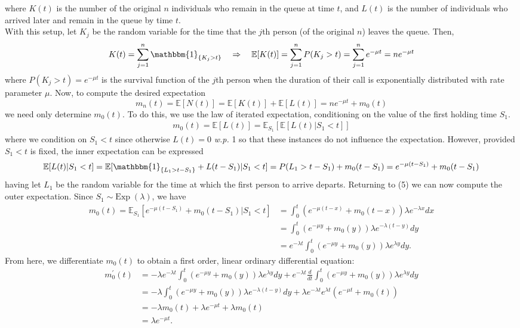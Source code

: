 \documentclass[11pt, letterpaper]{article}
\newcommand{\mbb}[1]{\mathbb{#1}}
\begin{document}
    where $K(t)$ is the number of the original $n$ individuals who remain in the queue at time $t$, and $L(t)$ is the number of individuals
    who arrived later and remain in the queue by time $t$.\\[10pt]
    With this setup, let $K_j$ be the random variable for the time that the $j$th person (of the original $n$) leaves the queue. Then,
    \[K(t)=\sum_{j=1}^n\mathbbm{1}_{\{K_j>t\}}\quad\Rightarrow\quad\mbb{E}[K(t)]=\sum_{j=1}^nP(K_j>t)=\sum_{j=1}^ne^{-\mu t}=ne^{-\mu t}\]
    where $P(K_j>t)=e^{-\mu t}$ is the survival function of the $j$th person when the duration of their call is exponentially distributed with rate parameter $\mu$. Now, to compute the desired expectation
    \[m_n(t)=\mbb{E}[N(t)]=\mbb{E}[K(t)]+\mbb{E}[L(t)]=ne^{-\mu t}+m_0(t)\]
    we need only determine $m_0(t)$. To do this, we use the law of iterated expectation, conditioning on the value of the first holding time $S_1$.
    \begin{align*}
        m_0(t)=\mbb{E}[L(t)]=\mbb{E}_{S_1}[\mbb{E}[L(t)|S_1<t]]\tag{5}
    \end{align*}
    where we condition on $S_1<t$ since otherwise $L(t)=0$ {\it w.p.} 1 so that these instances do not influence the expectation. However, provided $S_1<t$ is fixed, the inner expectation can be expressed
    \[\mbb{E}[L(t)|S_1<t]=\mbb{E}[\mathbbm{1}_{\{L_1>t-S_1\}}+L(t-S_1)|S_1<t]=P(L_1>t-S_1)+m_0(t-S_1)=e^{-\mu(t-S_1)}+m_0(t-S_1)\]
    having let $L_1$ be the random variable for the time at which the first person to arrive departs. Returning to (5) we can now compute the outer expectation. Since $S_1\sim\text{Exp}\;(\lambda)$, we have
    \begin{align*}
        m_0(t)=\mbb{E}_{S_1}[e^{-\mu(t-S_1)}+m_0(t-S_1)|S_1<t]&=\int_{0}^t\left(e^{-\mu(t-x)}+m_0(t-x)\right)\lambda e^{-\lambda x}dx\\
        &=\int_0^t\left(e^{-\mu y}+m_0(y)\right)\lambda e^{-\lambda(t-y)}dy\tag{substituting $y=t-x$}\\
        &=e^{-\lambda t}\int_0^t\left(e^{-\mu y}+m_0(y)\right)\lambda e^{\lambda y}dy.
    \end{align*}
    From here, we differentiate $m_0(t)$ to obtain a first order, linear ordinary differential equation:
    \begin{align*}
        m_0^\prime(t)&=-\lambda e^{-\lambda t}\int_0^t\left(e^{-\mu y}+m_0(y)\right)\lambda e^{\lambda y}dy+e^{-\lambda t} \frac{d}{dt}\int_0^t\left(e^{-\mu y}+m_0(y)\right)\lambda e^{\lambda y}dy\\
        &=-\lambda \int_0^t\left(e^{-\mu y}+m_0(y)\right)\lambda e^{-\lambda (t-y)}dy+\lambda e^{-\lambda t}e^{\lambda t}(e^{-\mu t}+m_0(t))\\
        &=-\lambda m_0(t)+\lambda e^{-\mu t}+\lambda m_0(t)\\
        &=\lambda e^{-\mu t}.
    \end{align*}
\end{document}
